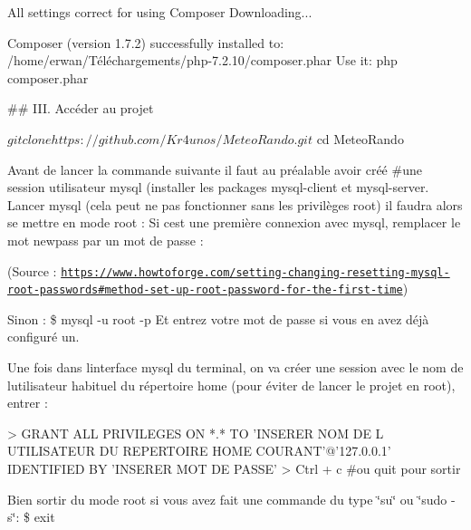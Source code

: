 \begin{DoxyCode}
All settings correct for using Composer
Downloading...

Composer (version 1.7.2) successfully installed to: /home/erwan/Téléchargements/php-7.2.10/composer.phar
Use it: php composer.phar
\end{DoxyCode}


\#\# I\+II. Accéder au projet \label{_acces_projet}%
 
\begin{DoxyCode}
$ git clone https://github.com/Kr4unos/MeteoRando.git
$ cd MeteoRando
\end{DoxyCode}



\begin{DoxyItemize}
\item Avant de lancer la commande suivante il faut au préalable avoir créé \#une session utilisateur mysql (installer les packages mysql-\/client et mysql-\/server. Lancer mysql (cela peut ne pas fonctionner sans les privilèges root) il faudra alors se mettre en mode root \+: Si c\textquotesingle{}est une première connexion avec mysql, remplacer le mot newpass par un mot de passe \+: 

\end{DoxyItemize}

(Source \+: \href{https://www.howtoforge.com/setting-changing-resetting-mysql-root-passwords#method-set-up-root-password-for-the-first-time}{\tt https\+://www.\+howtoforge.\+com/setting-\/changing-\/resetting-\/mysql-\/root-\/passwords\#method-\/set-\/up-\/root-\/password-\/for-\/the-\/first-\/time})


\begin{DoxyItemize}
\item Sinon \+: {\ttfamily \$ mysql -\/u root -\/p} Et entrez votre mot de passe si vous en avez déjà configuré un.
\item Une fois dans l\textquotesingle{}interface mysql du terminal, on va créer une session avec le nom de l\textquotesingle{}utilisateur habituel du répertoire home (pour éviter de lancer le projet en root), entrer \+: 
\begin{DoxyCode}
> GRANT ALL PRIVILEGES ON *.* TO 'INSERER NOM DE L UTILISATEUR DU REPERTOIRE HOME COURANT'@'127.0.0.1'
       IDENTIFIED BY 'INSERER MOT DE PASSE'
> Ctrl + c #ou quit pour sortir
\end{DoxyCode}

\item Bien sortir du mode root si vous avez fait une commande du type \char`\"{}su\char`\"{} ou \char`\"{}sudo -\/s\char`\"{}\+: {\ttfamily \$ exit}
\end{DoxyItemize}


